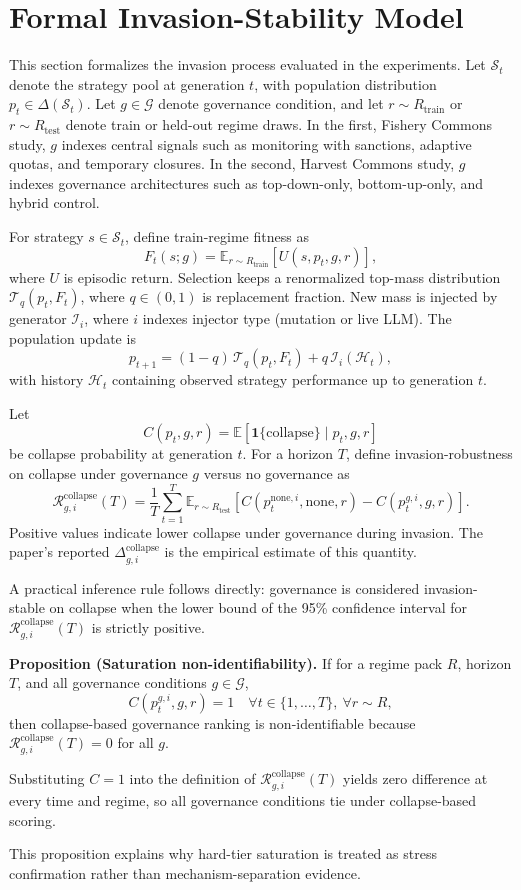 \section{Formal Invasion-Stability Model}\label{sec:theory}

This section formalizes the invasion process evaluated in the experiments. Let \(\mathcal{S}_t\) denote the strategy pool at generation \(t\), with population distribution \(p_t\in\Delta(\mathcal{S}_t)\). Let \(g\in\mathcal{G}\) denote governance condition, and let \(r\sim R_{\text{train}}\) or \(r\sim R_{\text{test}}\) denote train or held-out regime draws. In the first, Fishery Commons study, \(g\) indexes central signals such as monitoring with sanctions, adaptive quotas, and temporary closures. In the second, Harvest Commons study, \(g\) indexes governance architectures such as top-down-only, bottom-up-only, and hybrid control.

For strategy \(s\in\mathcal{S}_t\), define train-regime fitness as
\[
F_t(s;g)=\mathbb{E}_{r\sim R_{\text{train}}}\left[U(s,p_t,g,r)\right],
\]
where \(U\) is episodic return. Selection keeps a renormalized top-mass distribution \(\mathcal{T}_q(p_t,F_t)\), where \(q\in(0,1)\) is replacement fraction. New mass is injected by generator \(\mathcal{I}_i\), where \(i\) indexes injector type (mutation or live LLM). The population update is
\[
p_{t+1}=(1-q)\,\mathcal{T}_q(p_t,F_t)+q\,\mathcal{I}_i(\mathcal{H}_t),
\]
with history \(\mathcal{H}_t\) containing observed strategy performance up to generation \(t\).

Let
\[
C(p_t,g,r)=\mathbb{E}[\mathbf{1}\{\text{collapse}\}\mid p_t,g,r]
\]
be collapse probability at generation \(t\). For a horizon \(T\), define invasion-robustness on collapse under governance \(g\) versus no governance as
\[
\mathcal{R}^{\text{collapse}}_{g,i}(T)=\frac{1}{T}\sum_{t=1}^{T}
\mathbb{E}_{r\sim R_{\text{test}}}\!
\left[C\!\left(p_t^{\text{none},i},\text{none},r\right)-C\!\left(p_t^{g,i},g,r\right)\right].
\]
Positive values indicate lower collapse under governance during invasion. The paper's reported
\(\Delta^{\text{collapse}}_{g,i}\) is the empirical estimate of this quantity.

A practical inference rule follows directly: governance is considered invasion-stable on collapse when the lower bound of the 95\% confidence interval for \(\mathcal{R}^{\text{collapse}}_{g,i}(T)\) is strictly positive.

\textbf{Proposition (Saturation non-identifiability).}
If for a regime pack \(R\), horizon \(T\), and all governance conditions \(g\in\mathcal{G}\),
\[
C\!\left(p_t^{g,i},g,r\right)=1\quad \forall t\in\{1,\dots,T\},\ \forall r\sim R,
\]
then collapse-based governance ranking is non-identifiable because
\(\mathcal{R}^{\text{collapse}}_{g,i}(T)=0\) for all \(g\).

Substituting \(C=1\) into the definition of \(\mathcal{R}^{\text{collapse}}_{g,i}(T)\) yields zero difference at every time and regime, so all governance conditions tie under collapse-based scoring.

This proposition explains why hard-tier saturation is treated as stress confirmation rather than mechanism-separation evidence.
